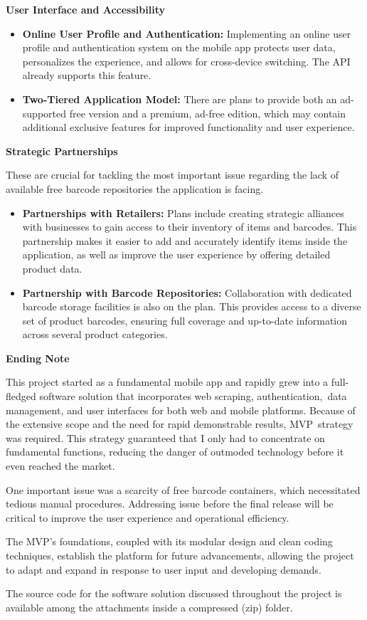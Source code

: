 \pagebreak

\noindent\textbf{User Interface and Accessibility}

\begin{itemize}
	\item \textbf{Online User Profile and Authentication:} Implementing an online user profile and authentication system on the mobile app protects user data, personalizes the experience, and allows for cross-device switching. The API already supports this feature.
	\item \textbf{Two-Tiered Application Model:} There are plans to provide both an ad-supported free version and a premium, ad-free edition, which may contain additional exclusive features for improved functionality and user experience.
\end{itemize}

\noindent\textbf{Strategic Partnerships}

These are crucial for tackling the most important issue regarding the lack of available free barcode repositories the application is facing.

\begin{itemize}
	\item \textbf{Partnerships with Retailers:} Plans include creating strategic alliances with businesses to gain access to their inventory of items and barcodes. This partnership makes it easier to add and accurately identify items inside the application, as well as improve the user experience by offering detailed product data.
	\item \textbf{Partnership with Barcode Repositories:} Collaboration with dedicated barcode storage facilities is also on the plan. This provides access to a diverse set of product barcodes, ensuring full coverage and up-to-date information across several product categories.
\end{itemize}

\noindent\textbf{Ending Note}

This project started as a fundamental mobile app and rapidly grew into a full-fledged software solution that incorporates web scraping, authentication, data management, and user interfaces for both web and mobile platforms. Because of the extensive scope and the need for rapid demonstrable results, MVP strategy was required. This strategy guaranteed that I only had to concentrate on fundamental functions, reducing the danger of outmoded technology before it even reached the market.

One important issue was a scarcity of free barcode containers, which necessitated tedious manual procedures. Addressing issue before the final release will be critical to improve the user experience and operational efficiency.

The MVP's foundations, coupled with its modular design and clean coding techniques, establish the platform for future advancements, allowing the project to adapt and expand in response to user input and developing demands.

The source code for the software solution discussed throughout the project is available among the attachments inside a compressed (zip) folder.

